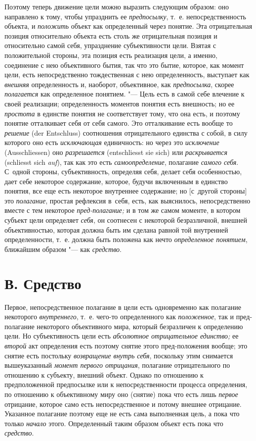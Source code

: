 Поэтому теперь движение цели можно выразить следующим образом: оно направлено
к тому, чтобы упразднить ее {\em предпосылку}, т.~е. непосредственность
объекта, и {\em положить} объект как
определенный через понятие. Эта отрицательная позиция относительно объекта
есть столь же отрицательная позиция и относительно самой себя, упразднение
субъективности цели. Взятая с положительной стороны, эта позиция есть
реализация цели, а именно, соединение с нею объективного бытия, так что это
бытие, которое, как момент цели, есть непосредственно тождественная с нею
определенность, выступает как {\em внешняя}
определенность и, наоборот, объективное, как
{\em предпосылка}, скорее {\em полагается} как
определенное понятием. "--- Цель есть в самой себе влечение к
своей реализации; определенность моментов понятия есть внешность; но ее
{\em простота} в единстве
понятия не соответствует тому, что она есть, и поэтому понятие отталкивает
себя от себя самого. Это отталкивание есть вообще то
{\em решение} (der Entschluss)
соотношения отрицательного единства с собой, в силу которого
оно есть {\em исключающая} единичность: но через это
{\em исключение} (Aus\-schliessen) оно {\em разрешается}
(ent\-schliesst sie sich) или {\em раскрывается} (schliesst sich
{\em auf}), так как это есть {\em самоопределение}, полагание {\em самого
себя}. С~одной стороны, субъективность, определяя себя,
делает себя особенностью, дает себе некоторое содержание, которое, будучи
включенным в единство понятия, все еще есть некоторое внутреннее
содержание; но [с~другой стороны] это {\em полагание}, простая
рефлексия в~себя, есть, как выяснилось, непосредственно вместе с тем
некоторое {\em пред-полагание;} и в том же самом моменте, в котором субъект
цели определяет {\em себя}, он соотнесен
с некоторой безразличной, внешней объективностью, которая должна быть им
сделана равной той внутренней определенности, т.~е. должна быть положена как
нечто {\em определенное понятием}, ближайшим образом "--- как {\em средство}.

\section[В. Средство]{В. Средство}

Первое, непосредственное полагание в цели есть одновременно
как полагание некоторого {\em внутреннего}, т.~е.
чего-то определенного как {\em положенное}, так и
пред-полагание некоторого объективного мира, который безразличен к
определению цели. Но субъективность цели есть
{\em абсолютное отрицательное единство;} ее {\em второй} акт
определения есть поэтому снятие этого пред-положения вообще; это
снятие есть постольку {\em возвращение внутрь себя},
поскольку этим снимается вышеуказанный {\em момент первого отрицания},
полагание отрицательного по отношению к субъекту, внешний
объект. Однако по отношению к предположенной предпосылке или к
непосредственности процесса определения, по отношению к объективному миру
оно (снятие) пока что есть лишь {\em первое} отрицание, которое само есть
непосредственное и потому внешнее отрицание. Указанное полагание поэтому еще
не есть сама выполненная цель, а пока что только {\em начало} этого.
Определенный таким образом объект есть пока что {\em средство}.

